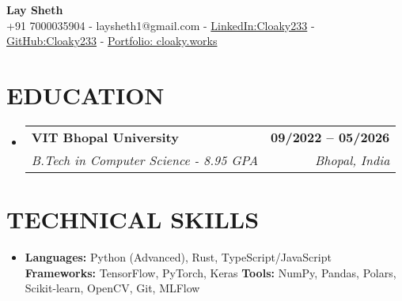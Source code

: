 \documentclass[letterpaper,7pt]{article}
\makeatletter
\newcommand{\resumeItem}[1]{
  \item\small{
    {#1 \vspace{-2pt}}
  }
}
\newcommand{\resumeSubheading}[4]{
  \vspace{1pt}\item
    \begin{tabular*}{1.0\textwidth}[t]{l@{\extracolsep{\fill}}r}
      \textbf{\normalsize#1} & \textbf{\small #2} \\
      \textit{\normalsize#3} & \textit{\small #4} \\
    \end{tabular*}\vspace{-2pt}
}
\newcommand{\resumeSubHeadingListStart}{\begin{itemize}[leftmargin=0.0in, label={}]}
\newcommand{\resumeSubHeadingListEnd}{\end{itemize}}
\newcommand{\resumeItemListStart}{\begin{itemize}[leftmargin=0.1in]}
\newcommand{\resumeItemListEnd}{\end{itemize}\vspace{-2pt}}
\makeatother
\begin{document}
\begin{center}
    {\huge \textbf{Lay Sheth}} \\ \vspace{2pt}
    {+91 7000035904}
    \small{ - }
    {laysheth1@gmail.com}
    \small{ - }
    {\href{https://linkedin.com/in/cloaky233}{LinkedIn:Cloaky233}}
    \small{ - }
    {\href{https://github.com/CLoaKY233}{GitHub:Cloaky233}}
    \small{ - }
    {\href{https://cloaky.works}{Portfolio: cloaky.works}}
    \vspace{-7pt}
\end{center}



\section{{EDUCATION}}
\resumeSubHeadingListStart
    \resumeSubheading
      {VIT Bhopal University}{09/2022 -- 05/2026}
      {B.Tech in Computer Science - 8.95 GPA}{Bhopal, India}

\resumeSubHeadingListEnd

\section{{TECHNICAL SKILLS}}
\resumeItemListStart
    \resumeItem{
        \textbf{Languages:} Python (Advanced), Rust, TypeScript/JavaScript \quad
        \textbf{Frameworks:} TensorFlow, PyTorch, Keras \quad
        \textbf{Tools:} NumPy, Pandas, Polars, Scikit-learn, OpenCV, Git, MLFlow
    }
\resumeItemListEnd
\end{document}
